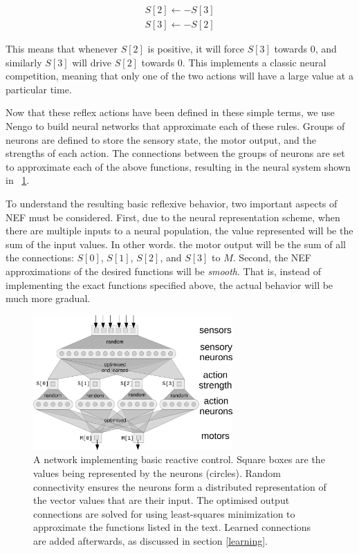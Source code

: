 \documentclass[conference]{IEEEtran}
\begin{document}
\begin{equation}
\begin{split}
	S[2] \leftarrow -S[3] \\
	S[3] \leftarrow -S[2]
\end{split}
\end{equation}

This means that whenever $S[2]$ is positive, it will force $S[3]$ towards $0$, 
and similarly $S[3]$ will drive $S[2]$ towards $0$.  This implements a classic
neural competition, meaning that only one of the two actions will have a large
value at a particular time.

Now that these reflex actions have been defined in these simple terms, we use
Nengo to build neural networks that approximate each of these rules.  Groups
of neurons are defined to store the sensory state, the motor output, and the 
strengths of each action. The connections between the groups of neurons are 
set to approximate each of the above functions, resulting in the neural 
system shown in \figurename~\ref{Flow}. 

To understand the resulting basic reflexive behavior,
two important aspects of NEF must be considered. First, due to the neural 
representation scheme, when there are multiple inputs to a neural population, 
the value represented will be the sum of the input values. In other words. the 
motor output will be the sum of all the connections: $S[0]$, $S[1]$, $S[2]$, and $S[3]$ to $M$. 
Second, the NEF approximations of the desired functions will be \textit{smooth}. 
That is, instead of implementing the exact functions specified above, the 
actual behavior will be much more gradual. 

\begin{figure}[!t]
\centering
\includegraphics[width=3in]{network.png}
\caption{A network implementing basic reactive control. Square boxes are the
values being represented by the neurons (circles).  Random connectivity
ensures the neurons form a distributed representation of the vector values
that are their input.  The optimised output connections are solved for
using least-squares minimization to approximate the functions listed in
the text.  Learned connections are added afterwards, as discussed in 
section \ref{learning}.}
\label{Flow}
\end{figure}
\end{document}
